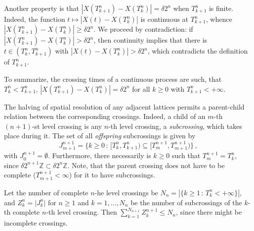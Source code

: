 \documentclass[a4paper]{article}
\begin{document}
Another property is that $|X(T_{k+1}^n) - X(T_k^n)| = \delta 2^n$ when $T_{k+1}^n$
is finite. Indeed, the function $t \mapsto |X(t) - X(T_k^n)|$ is continuous at $T_{k+1}^n$,
whence $|X(T_{k+1}^n) - X(T_k^n)| \geq \delta 2^n$. We proceed by contradiction:
if $|X(T_{k+1}^n) - X(T_k^n)| > \delta 2^n$, then continuity implies that there is
$t\in (T_k^n, T_{k+1}^n)$ with $|X(t) - X(T_k^n)| > \delta 2^n$, which contradicts
the definition of $T_{k+1}^n$.

To summarize, the crossing times of a continuous process are such, that $T_k^n < T_{k+1}^n$,
$|X(T_{k+1}^n) - X(T_k^n)| = \delta 2^n$ for all $k\geq0$ with $T_{k+1}^n < +\infty$.

The halving of spatial resolution of any adjacent lattices permits a parent-child
relation between the corresponding crossings. Indeed, a child of an $m$-th $(n+1)$-st
level crossing is any $n$-th level crossing, a \emph{subcrossing}, which takes place
during it. The set of all \emph{offspring} subcrossings is given by
\begin{equation} \label{eq:crossing_offspring}
    J_{m+1}^{n+1}
        = \bigl\{ k \geq 0 \,:\,
            [T_k^n, T_{k+1}^n) \subseteq [T_m^{n+1}, T_{m+1}^{n+1})
        \bigr \} \,,
\end{equation}
with $J_0^{n+1} = \emptyset$. Furthermore, there necessarily is $k\geq 0$ such that
$T_m^{n+1} = T_k^n$, since $\delta 2^{n+1} \mathbb{Z} \subset \delta 2^n \mathbb{Z}$.
Note, that the parent crossing does not have to be complete ($T_{m+1}^{n+1} < \infty$)
for it to have subcrossings.

Let the number of complete $n$-he level crossings be $N_n = |\{k\geq 1\,:\, T_k^n < +\infty\}|$,
and $Z_k^n = \bigl| J_k^n \bigr|$ for $n\geq1$ and $k = 1,\ldots, N_n$ be the number
of subcrossings of the $k$-th complete $n$-th level crossing. Then $\sum_{k=1}^{N_{n+1}} Z_k^{n+1} \leq N_n$,
since there might be incomplete crossings.
\end{document}
